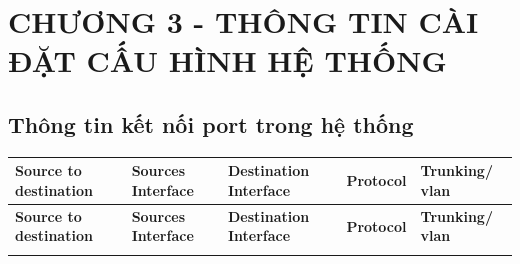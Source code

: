 \documentclass[a4paper, 12pt]{article}
\begin{document}
\newpage
\section*{CHƯƠNG 3 - THÔNG TIN CÀI ĐẶT CẤU HÌNH HỆ THỐNG}
\setcounter{section}{3}
\setcounter{subsection}{0}
\setcounter{figure}{0}
\setcounter{table}{0}
\subsection{Thông tin kết nối port trong hệ thống}
\begin{center}
\def\arraystretch{2.1}\begin{longtable}{|p{}|p{}|p{}|p{}|p{}|}


\hline \textbf{Source to destination }    &      \textbf{Sources Interface }    &      \textbf{Destination Interface }    &    \textbf{Protocol } &     \textbf{Trunking/ vlan }\\ \hline
\endfirsthead



\hline \textbf{Source to destination } &  \textbf{Sources Interface } &  \textbf{Destination Interface } &  \textbf{Protocol } &  \textbf{Trunking/ vlan} \\ \hline
\endhead


\endfoot


\endlastfoot



\end{longtable}
\end{center}
\end{document}
